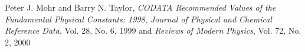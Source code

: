 


\begin{thebibliography}{99}

 Peter J. Mohr and Barry N. Taylor, \emph{CODATA Recommended Values of the Fundamental Physical Constants: 1998, Journal of Physical and Chemical Reference Data}, Vol. 28, No. 6, 1999 and \emph{Reviews of Modern Physics}, Vol. 72, No. 2, 2000
\end{thebibliography}
